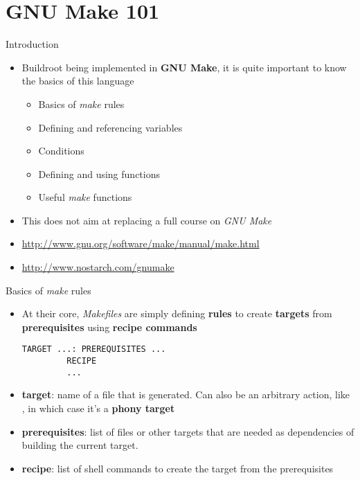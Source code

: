 \section{GNU Make 101}

\begin{frame}{Introduction}
  \begin{itemize}
  \item Buildroot being implemented in {\bf GNU Make}, it is quite
    important to know the basics of this language
    \begin{itemize}
    \item Basics of {\em make} rules
    \item Defining and referencing variables
    \item Conditions
    \item Defining and using functions
    \item Useful {\em make} functions
    \end{itemize}
  \item This does not aim at replacing a full course on {\em GNU Make}
  \item \url{http://www.gnu.org/software/make/manual/make.html}
  \item \url{http://www.nostarch.com/gnumake}
  \end{itemize}
\end{frame}

\begin{frame}[fragile]{Basics of {\em make} rules}
  \begin{itemize}
  \item At their core, {\em Makefiles} are simply defining {\bf rules}
    to create {\bf targets} from {\bf prerequisites} using {\bf recipe
      commands}
    \begin{block}{}
\begin{verbatim}
TARGET ...: PREREQUISITES ...
         RECIPE
         ...
\end{verbatim}
    \end{block}
  \item {\bf target}: name of a file that is generated. Can also be an
    arbitrary action, like , in which case it's a {\bf
      phony target}
  \item {\bf prerequisites}: list of files or other targets that are
    needed as dependencies of building the current target.
  \item {\bf recipe}: list of shell commands to create the target from
    the prerequisites
  \end{itemize}
\end{frame}


